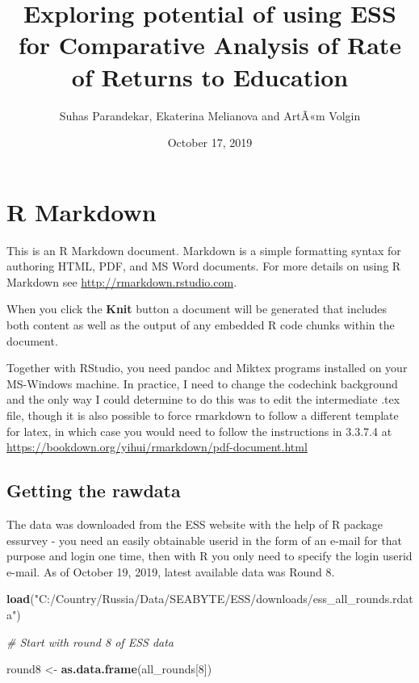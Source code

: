 \documentclass[]{article}
\title{Exploring potential of using ESS for Comparative Analysis of Rate of
Returns to Education}
\author{Suhas Parandekar, Ekaterina Melianova and ArtÃ«m Volgin}
\date{October 17, 2019}
\newenvironment{Shaded}{\begin{snugshade}}{\end{snugshade}}
\newcommand{\CommentTok}[1]{\textcolor[rgb]{0.56,0.35,0.01}{\textit{#1}}}
\newcommand{\DecValTok}[1]{\textcolor[rgb]{0.00,0.00,0.81}{#1}}
\newcommand{\KeywordTok}[1]{\textcolor[rgb]{0.13,0.29,0.53}{\textbf{#1}}}
\newcommand{\NormalTok}[1]{#1}
\newcommand{\StringTok}[1]{\textcolor[rgb]{0.31,0.60,0.02}{#1}}
\begin{document}
\maketitle

\hypertarget{r-markdown}{%
\section{R Markdown}\label{r-markdown}}

This is an R Markdown document. Markdown is a simple formatting syntax
for authoring HTML, PDF, and MS Word documents. For more details on
using R Markdown see \url{http://rmarkdown.rstudio.com}.

When you click the \textbf{Knit} button a document will be generated
that includes both content as well as the output of any embedded R code
chunks within the document.

Together with RStudio, you need pandoc and Miktex programs installed on
your MS-Windows machine. In practice, I need to change the codechink
background and the only way I could determine to do this was to edit the
intermediate .tex file, though it is also possible to force rmarkdown to
follow a different template for latex, in which case you would need to
follow the instructions in 3.3.7.4 at
\url{https://bookdown.org/yihui/rmarkdown/pdf-document.html}

\hypertarget{getting-the-rawdata}{%
\subsection{Getting the rawdata}\label{getting-the-rawdata}}

The data was downloaded from the ESS website with the help of R package
essurvey - you need an easily obtainable userid in the form of an e-mail
for that purpose and login one time, then with R you only need to
specify the login userid e-mail. As of October 19, 2019, latest
available data was Round 8. \newline

\begin{Shaded}
\begin{Highlighting}[]
\KeywordTok{load}\NormalTok{(}\StringTok{"C:/Country/Russia/Data/SEABYTE/ESS/downloads/ess_all_rounds.rdata"}\NormalTok{)}

\CommentTok{# Start with round 8 of ESS data}

\NormalTok{round8 <-}\StringTok{ }\KeywordTok{as.data.frame}\NormalTok{(all_rounds[}\DecValTok{8}\NormalTok{])}
\end{Highlighting}
\end{Shaded}
\end{document}
